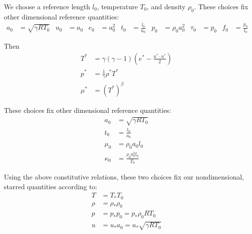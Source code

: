 \documentclass[letterpaper,11pt,nointlimits,reqno]{amsart}
\begin{document}
We choose a reference length $l_{0}$, temperature $T_{0}$, and density
$\rho_{0}$.  These choices fix other dimensional reference quantities:
\begin{align*}
  a_{0} &= \sqrt{\gamma{}RT_{0}}
  &
  u_{0} &= a_{0}
  &
  e_{0} &= a_{0}^{2}
  &
  t_{0} &= \frac{l_{0}}{a_{0}}
  &
  p_{0} &= \rho_{0} a_{0}^{2}
  &
  \tau_{0} &= p_{0}
  &
  f_{0} &= \frac{p_{0}}{l_{0}} %
\end{align*}

Then
\begin{align}
  T^{*} &= \gamma \left( \gamma-1 \right) 
           \left( e^{*} - \frac{u^{*}\cdot{}u^{*}}{2} \right)
  \\
  p^{*} &= \frac{1}{\gamma} \rho^{*} T^{*}
  \\
  \mu^{*} &= \left( T^{*} \right)^{\beta} 
\end{align}


These choices fix other dimensional
reference quantities:
\begin{align*}
  a_{0} &= \sqrt{\gamma{}RT_{0}}
  \\
  t_{0} &= \frac{l_{0}}{a_{0}}
  \\
  \mu_{0} &= \rho_{0} a_{0} l_{0}
  \\
  \kappa_{0} &= \frac{\rho_{0} a_{0}^{3} l_{0}}{T_{0}}
\end{align*}

Using the above constitutive relations, these two choices fix our
nondimensional, starred quantities according to:
\begin{align}
  T &= T_{*} T_{0}
  \\
  \rho &= \rho_{*} \rho_{0}
  \\
  p &= p_{*} p_{0} = p_{*} \rho_{0} R T_{0}
  \\
  u &= u_{*} a_{0} = u_{*} \sqrt{\gamma{}RT_{0}}
  \label{eq:refquantities}
\end{align}
\end{document}
